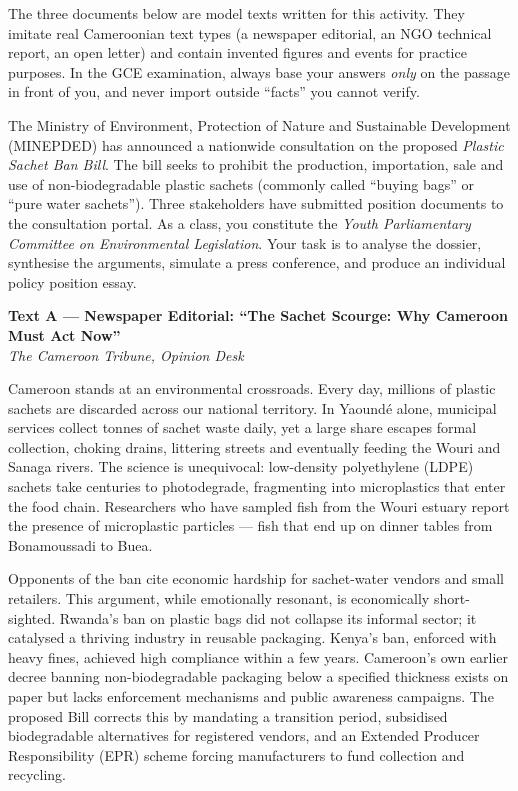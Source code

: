 \documentclass[11pt]{article}
\newcommand{\cle}[1]{{\popxbold\color{popdark}#1}}
\newcounter{popsec}
\newcounter{popsub}
\newcommand{\courssub}[1]{%
  \stepcounter{popsub}%
  \par\vspace{9pt}\noindent{\popxbold\fontsize{11.5}{13}\selectfont\color{popink}{\color{poporange}\thepopsec.\thepopsub}\hspace{6pt}#1}\par\nopagebreak\vspace{4pt}
}
\begin{document}
\begin{attention}
The three documents below are \cle{model texts} written for this activity. They imitate real Cameroonian text types (a newspaper editorial, an NGO technical report, an open letter) and contain invented figures and events for practice purposes. In the GCE examination, always base your answers \emph{only} on the passage in front of you, and never import outside ``facts'' you cannot verify.
\end{attention}

\courssub{Situation}

The Ministry of Environment, Protection of Nature and Sustainable Development (MINEPDED) has announced a nationwide consultation on the proposed \emph{Plastic Sachet Ban Bill}. The bill seeks to prohibit the production, importation, sale and use of non-biodegradable plastic sachets (commonly called ``\cle{buying bags}'' or ``\cle{pure water sachets}''). Three stakeholders have submitted position documents to the consultation portal. As a class, you constitute the \emph{Youth Parliamentary Committee on Environmental Legislation}. Your task is to analyse the dossier, synthesise the arguments, simulate a press conference, and produce an individual policy position essay.

\textbf{Text A --- Newspaper Editorial: ``The Sachet Scourge: Why Cameroon Must Act Now''} \\
\textit{The Cameroon Tribune, Opinion Desk}

Cameroon stands at an environmental crossroads. Every day, millions of plastic sachets are discarded across our national territory. In Yaoundé alone, municipal services collect tonnes of sachet waste daily, yet a large share escapes formal collection, choking drains, littering streets and eventually feeding the Wouri and Sanaga rivers. The science is unequivocal: low-density polyethylene (LDPE) sachets take centuries to photodegrade, fragmenting into microplastics that enter the food chain. Researchers who have sampled fish from the Wouri estuary report the presence of microplastic particles --- fish that end up on dinner tables from Bonamoussadi to Buea.

Opponents of the ban cite economic hardship for sachet-water vendors and small retailers. This argument, while emotionally resonant, is economically short-sighted. Rwanda's ban on plastic bags did not collapse its informal sector; it catalysed a thriving industry in reusable packaging. Kenya's ban, enforced with heavy fines, achieved high compliance within a few years. Cameroon's own earlier decree banning non-biodegradable packaging below a specified thickness exists on paper but lacks enforcement mechanisms and public awareness campaigns. The proposed Bill corrects this by mandating a transition period, subsidised biodegradable alternatives for registered vendors, and an \cle{Extended Producer Responsibility} (EPR) scheme forcing manufacturers to fund collection and recycling.
\end{document}
